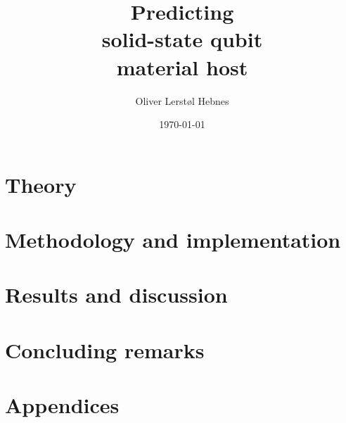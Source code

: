 \documentclass[twoside, english, notitlepage, 12pt]{uiofysmaster}
\author{Oliver Lerstøl Hebnes}
\title{Predicting\\
solid-state qubit\\
material host
}
\date{\today}
\begin{document}
\hypersetup{pageanchor=false}
\frontmatter

    \maketitle

    \begin{abstract}
      
    \end{abstract}

    \begin{dedication}
      
    \end{dedication}

    \begin{acknowledgements}
      
    \end{acknowledgements}

    \setcounter{tocdepth}{2}
    \tableofcontents

\mainmatter

      

    \part{Theory}
        
        
        

    \part{Methodology and implementation}

        

    \part{Results and discussion}

      
      
      

    \part{Concluding remarks}
      

    \part{Appendices}
    \appendix
        

    \printbibliography%
\end{document}
